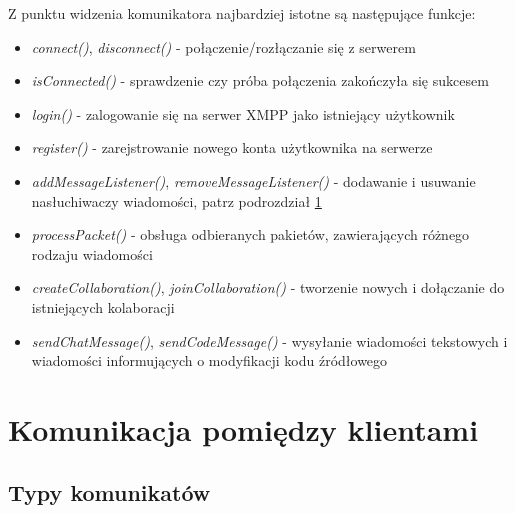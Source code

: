 \documentclass[polish,11pt,a4paper,twoside]{article}
\newenvironment{items}{
\begin{itemize}
  \setlength{\itemsep}{0pt}
  \setlength{\parskip}{0pt}
  \setlength{\parsep}{0pt}
  \setlength{\topsep}{0pt}
  \setlength{\partopsep}{0pt}
}{\end{itemize}}
\begin{document}
Z punktu widzenia komunikatora najbardziej istotne są następujące funkcje:
\begin{items}
\item \emph{connect()}, \emph{disconnect()} - połączenie/rozłączanie się z serwerem
\item \emph{isConnected()} - sprawdzenie czy próba połączenia zakończyła się sukcesem
\item \emph{login()} - zalogowanie się na serwer XMPP jako istniejący użytkownik
\item \emph{register()} - zarejstrowanie nowego konta użytkownika na serwerze
\item \emph{addMessageListener()}, \emph{removeMessageListener()} - dodawanie i usuwanie nasłuchiwaczy wiadomości, patrz podrozdział \ref{sec:komunikacja}
\item \emph{processPacket()} - obsługa odbieranych pakietów, zawierających różnego rodzaju wiadomości
\item \emph{createCollaboration()}, \emph{joinCollaboration()} - tworzenie nowych i dołączanie do istniejących kolaboracji
\item \emph{sendChatMessage()}, \emph{sendCodeMessage()} - wysyłanie wiadomości tekstowych i wiadomości informujących o modyfikacji kodu źródłowego
\end{items}

\clearpage

\section{Komunikacja pomiędzy klientami}
\label{sec:komunikacja}

\subsection{Typy komunikatów}
\end{document}
